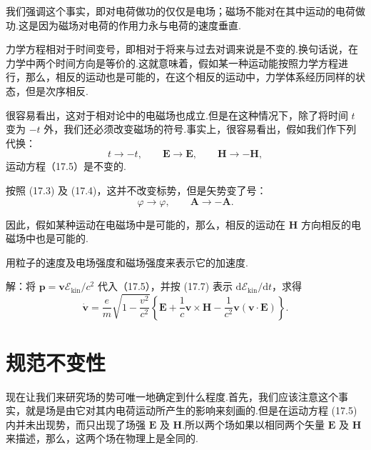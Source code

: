 我们强调这个事实，即对电荷做功的仅仅是电场；磁场不能对在其中运动的电荷做功.这是因为磁场对电荷的作用力永与电荷的速度垂直.

力学方程相对于时间变号，即相对于将来与过去对调来说是不变的.换句话说，在力学中两个时间方向是等价的.这就意味着，假如某一种运动能按照力学方程进行，那么，相反的运动也是可能的，在这个相反的运动中，力学体系经历同样的状态，但是次序相反.

很容易看出，这对于相对论中的电磁场也成立.但是在这种情况下，除了将时间 $t$ 变为 $-t$ 外，我们还必须改变磁场的符号.事实上，很容易看出，假如我们作下列代换：
\begin{equation}
  t\to-t,\qquad \boldsymbol{E}\to\boldsymbol{E},\qquad
  \boldsymbol{H}\to-\boldsymbol{H},
\end{equation}
运动方程（17.5）是不变的.

按照 (17.3) 及 (17.4)，这并不改变标势，但是矢势变了号：
\begin{equation}
  \varphi\to\varphi,\qquad \boldsymbol{A}\to-\boldsymbol{A}.
\end{equation}

因此，假如某种运动在电磁场中是可能的，那么，相反的运动在 $\boldsymbol{H}$ 方向相反的电磁场中也是可能的.

\begin{xiti}

\quad 用粒子的速度及电场强度和磁场强度来表示它的加速度.

解：将 $\boldsymbol{p}=\boldsymbol{v}\mathcal{E}_\mathrm{kin}/c^2$ 代入（17.5），并按 (17.7) 表示
$\mathrm{d}\mathcal{E}_\mathrm{kin}/\mathrm{d}t$，求得
\begin{equation*}
  \dot{\boldsymbol{v}}=\frac{e}{m}\sqrt{1-\frac{v^2}{c^2}}
  \left\{\boldsymbol{E}+\frac{1}{c}\boldsymbol{v}\times\boldsymbol{H}
  -\frac{1}{c^2}\boldsymbol{v}\left(\boldsymbol{v}\cdot\boldsymbol{E}\right)\right\}.
\end{equation*}

\end{xiti}

\section{规范不变性}

现在让我们来研究场的势可唯一地确定到什么程度.首先，我们应该注意这个事实，就是场是由它对其内电荷运动所产生的影响来刻画的.但是在运动方程 (17.5) 内并未出现势，而只出现了场强 $\boldsymbol{E}$ 及 $\boldsymbol{H}$.所以两个场如果以相同两个矢量 $\boldsymbol{E}$ 及 $\boldsymbol{H}$ 来描述，那么，这两个场在物理上是全同的.

